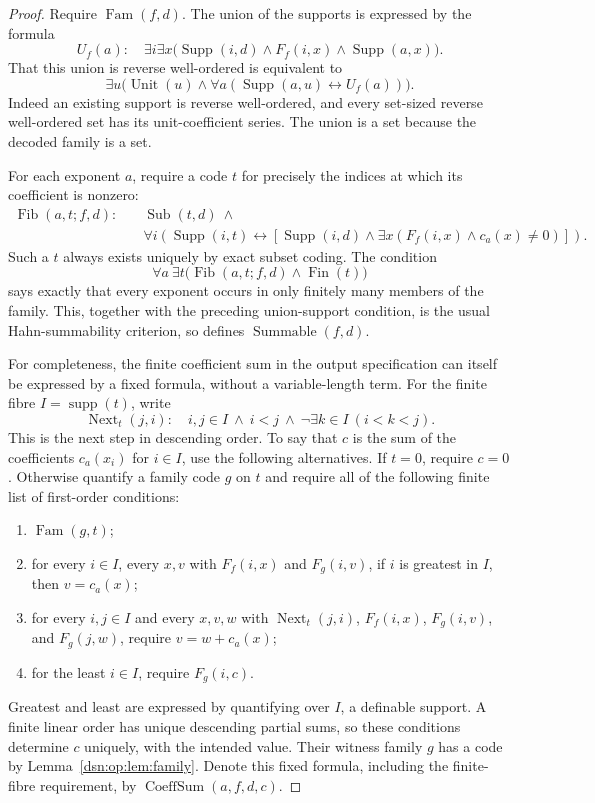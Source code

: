 \documentclass[11pt,a4paper]{article}
\numberwithin{equation}{section}
\theoremstyle{definition}
\theoremstyle{remark}
\begin{document}
\begin{proof}
Require $\operatorname{Fam}(f,d)$.  The union of the supports is expressed
by the formula
\[
 U_f(a):\quad
 \exists i\exists x\bigl(
 \operatorname{Supp}(i,d)\wedge F_f(i,x)
                       \wedge\operatorname{Supp}(a,x)\bigr).
\]
That this union is reverse well-ordered is equivalent to
\[
 \exists u\bigl(\operatorname{Unit}(u)\wedge
    \forall a(\operatorname{Supp}(a,u)\longleftrightarrow U_f(a))\bigr).
\]
Indeed an existing support is reverse well-ordered, and every set-sized
reverse well-ordered set has its unit-coefficient series.  The union is
a set because the decoded family is a set.

For each exponent $a$, require a code $t$ for precisely the indices at
which its coefficient is nonzero:
\[
 \begin{split}
 \operatorname{Fib}(a,t;f,d):\quad&\operatorname{Sub}(t,d)\ \wedge\\
 &\forall i\left(
   \operatorname{Supp}(i,t)\longleftrightarrow
   [\operatorname{Supp}(i,d)\wedge
     \exists x(F_f(i,x)\wedge c_a(x)\ne0)]\right).
 \end{split}
\]
Such a $t$ always exists uniquely by exact subset coding.  The condition
\[
 \forall a\ \exists t\bigl(
        \operatorname{Fib}(a,t;f,d)\wedge\operatorname{Fin}(t)\bigr)
\]
says exactly that every exponent occurs in only finitely many members of
the family.  This, together with the preceding union-support condition,
is the usual Hahn-summability criterion, so defines
$\operatorname{Summable}(f,d)$.

For completeness, the finite coefficient sum in the output specification
can itself be expressed by a fixed formula, without a variable-length
term.  For the finite fibre $I=\operatorname{supp}(t)$, write
\[
 \operatorname{Next}_t(j,i):\quad
 i,j\in I\ \wedge\ i<j\ \wedge\
 \neg\exists k\in I\ (i<k<j).
\]
This is the next step in descending order.  To say that $c$ is the sum of
the coefficients $c_a(x_i)$ for $i\in I$, use the following alternatives.
If $t=0$, require $c=0$.  Otherwise quantify a family code $g$ on $t$ and
require all of the following finite list of first-order conditions:
\begin{enumerate}
\item $\operatorname{Fam}(g,t)$;
\item for every $i\in I$, every $x,v$ with
$F_f(i,x)$ and $F_g(i,v)$, if $i$ is greatest in $I$, then $v=c_a(x)$;
\item for every $i,j\in I$ and every $x,v,w$ with
$\operatorname{Next}_t(j,i)$, $F_f(i,x)$, $F_g(i,v)$, and $F_g(j,w)$,
require $v=w+c_a(x)$;
\item for the least $i\in I$, require $F_g(i,c)$.
\end{enumerate}
Greatest and least are expressed by quantifying over $I$, a definable
support.  A finite linear order has unique descending partial sums, so
these conditions determine $c$ uniquely, with the intended value.  Their
witness family $g$ has a code by Lemma~\ref{dsn:op:lem:family}.  Denote this
fixed formula, including the finite-fibre requirement, by
$\operatorname{CoeffSum}(a,f,d,c)$.


\end{proof}
\end{document}
